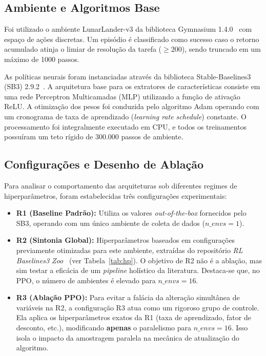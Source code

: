 \documentclass[conference]{IEEEtran}
\begin{document}
\subsection{Ambiente e Algoritmos Base}
Foi utilizado o ambiente LunarLander-v3 da biblioteca Gymnasium 1.4.0~\cite{towers2024} com espaço de ações discretas. Um episódio é classificado como sucesso caso o retorno acumulado atinja o limiar de resolução da tarefa ($\geq 200$), sendo truncado em um máximo de 1000 passos. 

As políticas neurais foram instanciadas através da biblioteca Stable-Baselines3 (SB3) 2.9.2~\cite{raffin2021}. A arquitetura base para os extratores de características consiste em uma rede Perceptron Multicamadas (MLP) utilizando a função de ativação ReLU. A otimização dos pesos foi conduzida pelo algoritmo Adam operando com um cronograma de taxa de aprendizado (\textit{learning rate schedule}) constante. O processamento foi integralmente executado em CPU, e todos os treinamentos possuíram um teto rígido de 300.000 passos de ambiente.

\subsection{Configurações e Desenho de Ablação}
Para analisar o comportamento das arquiteturas sob diferentes regimes de hiperparâmetros, foram estabelecidas três configurações experimentais:

\begin{itemize}
    \item \textbf{R1 (Baseline Padrão):} Utiliza os valores \textit{out-of-the-box} fornecidos pelo SB3, operando com um único ambiente de coleta de dados ($n\_envs=1$).
    \item \textbf{R2 (Sintonia Global):} Hiperparâmetros baseados em configurações previamente otimizadas para este ambiente, extraídas do repositório \textit{RL Baselines3 Zoo}~\cite{rlzoo} (ver Tabela~\ref{tab:hp}). O objetivo de R2 não é a ablação, mas sim testar a eficácia de um \textit{pipeline} holístico da literatura. Destaca-se que, no PPO, o número de ambientes é elevado para $n\_envs=16$.
    \item \textbf{R3 (Ablação PPO):} Para evitar a falácia da alteração simultânea de variáveis na R2, a configuração R3 atua como um rigoroso grupo de controle. Ela aplica os hiperparâmetros exatos da R1 (taxa de aprendizado, fator de desconto, etc.), modificando \textbf{apenas} o paralelismo para $n\_envs=16$. Isso isola o impacto da amostragem paralela na mecânica de atualização do algoritmo.
\end{itemize}
\end{document}
